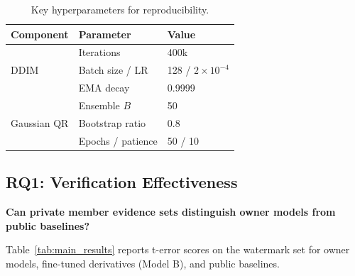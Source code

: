 \documentclass[sigconf, review, anonymous]{acmart}
\begin{document}
\begin{table}[t]
\caption{Key hyperparameters for reproducibility.}
\label{tab:hyperparams}
\begin{center}
\begin{small}
\begin{tabular}{@{}lll@{}}
\toprule
Component & Parameter & Value \\
\midrule
\multirow{3}{*}{DDIM} & Iterations & 400k \\
& Batch size / LR & 128 / $2{\times}10^{-4}$ \\
& EMA decay & 0.9999 \\
\midrule
\multirow{3}{*}{Gaussian QR} & Ensemble $B$ & 50 \\
& Bootstrap ratio & 0.8 \\
& Epochs / patience & 50 / 10 \\
\bottomrule
\end{tabular}
\end{small}
\end{center}
\end{table}

\subsection{RQ1: Verification Effectiveness}
\label{sec:main_results}

\textbf{Can private member evidence sets distinguish owner models from public baselines?}

Table~\ref{tab:main_results} reports t-error scores on the watermark set for owner models, fine-tuned derivatives (Model B), and public baselines.
\end{document}
